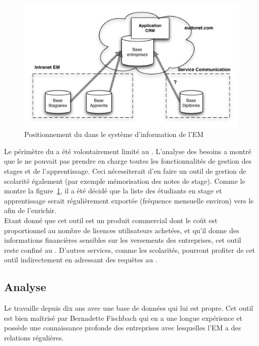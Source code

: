 \documentclass{book}
\begin{document}
\begin{figure}[hbt]
\begin{center}
\includegraphics[width=.9\linewidth]{figs/crm_overview.pdf}
\end{center}
\caption{Positionnement du  dans le système d'information de l'EM}
\label{fg:crm_overview}
\end{figure}

Le périmètre du  a été  volontairement limité au \sre. L'analyse des
besoins a montré que le  ne pouvait pas prendre en charge toutes les
fonctionnalités de gestion des stages et de l'apprentissage.  Ceci nécessiterait
d'en faire un outil de gestion  de scolarité également (par exemple mémorisation
des notes de  stage). Comme le montre la figure~\ref{fg:crm_overview},  il a été
décidé que la liste des étudiants en stage et apprentissage serait régulièrement
exportée   (fréquence  mensuelle   environ)   vers  le     afin   de
l'enrichir.\\

Etant  donné  que  cet  outil  est  un  produit  commercial  dont  le  coût  est
proportionnel au  nombre de licences  utilisateurs achetées, et qu'il  donne des
informations financières sensibles sur les versements des entreprises, cet outil
reste  confiné  au  \sre.  D'autres services,  comme  les  scolarités,  pourront
profiter de cet outil indirectement en adressant des requêtes au \sre.

\subsection{Analyse}
Le  \sre  travaille  depuis dix  ans  avec  une  base  de données  qui  lui  est
propre. Cet outil est bien maîtrisé par Bernadette Fischbach qui en a une longue
expérience et possède une connaissance  profonde des entreprises avec lesquelles
l'EM a des relations régulières. \\
\end{document}
